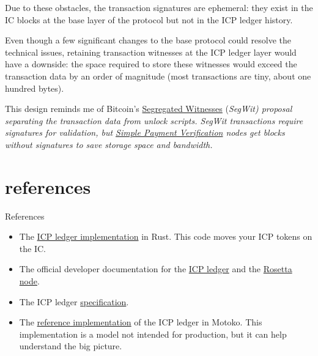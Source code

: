 \documentclass{article}
\begin{document}
Due to these obstacles, the transaction signatures are ephemeral: they exist in the IC blocks at the base layer of the protocol but not in the ICP ledger history.

Even though a few significant changes to the base protocol could resolve the technical issues, retaining transaction witnesses at the ICP ledger layer would have a downside: the space required to store these witnesses would exceed the transaction data by an order of magnitude (most transactions are tiny, about one hundred bytes).

This design reminds me of Bitcoin's \href{https://en.wikipedia.org/wiki/SegWit}{Segregated Witnesses} (\em{SegWit}) proposal separating the transaction data from unlock scripts.
SegWit transactions require signatures for validation, but \href{https://en.bitcoinwiki.org/wiki/Simplified_Payment_Verification}{Simple Payment Verification} nodes get blocks without signatures to save storage space and bandwidth.

\section{references}{References}
\begin{itemize}
  \item
    The \href{https://github.com/dfinity/ic/tree/59ad371332f26ee1af54a15c568dd10a2093224c/rs/rosetta-api/icp_ledger/ledger}{ICP ledger implementation} in Rust.
    This code moves your ICP tokens on the IC.
  \item
    The official developer documentation for the \href{https://internetcomputer.org/docs/current/developer-docs/integrations/ledger/}{ICP ledger} and the \href{https://internetcomputer.org/docs/current/developer-docs/integrations/rosetta/}{Rosetta node}.
  \item
    The ICP ledger \href{https://internetcomputer.org/docs/current/references/ledger}{specification}.
  \item
    The \href{https://github.com/dfinity/ledger-ref}{reference implementation} of the ICP ledger in Motoko.
    This implementation is a model not intended for production, but it can help understand the big picture.
\end{itemize}
\end{document}
